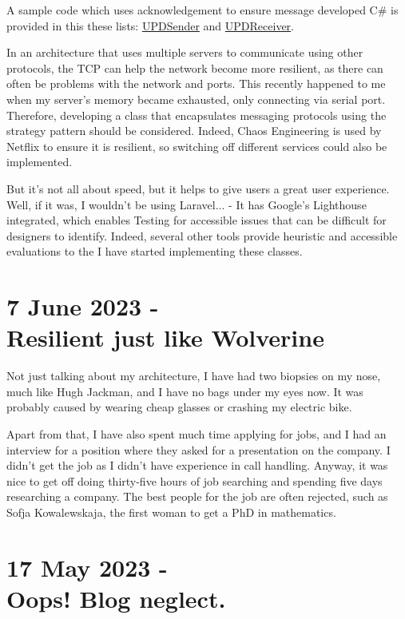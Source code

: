 \documentclass{article}
\begin{document}
 A sample code which uses acknowledgement to ensure message developed C\# is provided in this these lists: \href{https://gist.github.com/b1ngster/50f5814d010b6d2cd79eec733a0d2bf1}{UPDSender} and \href{https://gist.github.com/b1ngster/50f5814d010b6d2cd79eec733a0d2bf1}{UPDReceiver}. 

In an architecture that uses multiple servers to communicate using other protocols, the TCP can help the network become more resilient, as there can often be problems with the network and ports. This recently happened to me when my server's memory became exhausted, only connecting via serial port. Therefore, developing a class that encapsulates messaging protocols using the strategy pattern should be considered. Indeed, Chaos Engineering is used by Netflix to ensure it is resilient, so switching off different services could also be implemented. 

But it's not all about speed, but it helps to give users a great user experience. Well, if it was, I wouldn't be using Laravel... - It has Google's Lighthouse integrated, which enables Testing for accessible issues that can be difficult for designers to identify. Indeed, several other tools provide heuristic and accessible evaluations to the I have started implementing these classes.



\section*{7 June 2023 - \\ Resilient just like Wolverine}

Not just talking about my architecture, I have had two biopsies on my nose, much like Hugh Jackman, and I have no bags under my eyes now. It was probably caused by wearing cheap glasses or crashing my electric bike. 

Apart from that, I have also spent much time applying for jobs, and I had an interview for a position where they asked for a presentation on the company. I didn't get the job as I didn't have experience in call handling. Anyway, it was nice to get off doing thirty-five hours of job searching and spending five days researching a company. The best people for the job are often rejected, such as Sofja Kowalewskaja, the first woman to get a PhD in mathematics.

\section*{17 May 2023 - \\ Oops! Blog neglect.}
\end{document}
